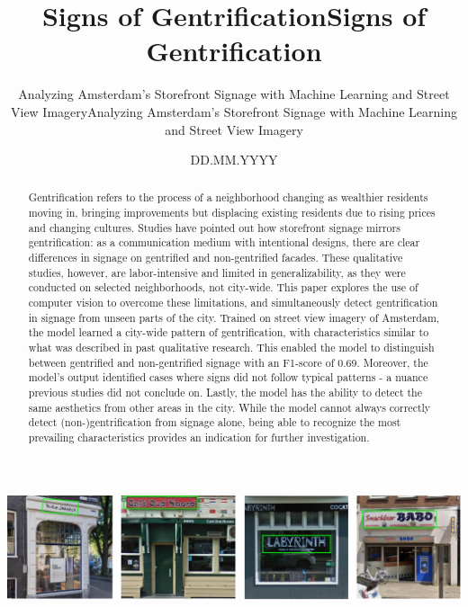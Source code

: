 \documentclass[ds, nofrontpicture, nofirstcompanypicture, nosecondcompanypicture]{mscthesis}
\title{Signs of Gentrification}
\subtitle{Analyzing Amsterdam's Storefront Signage with Machine Learning and Street View Imagery}
\date{DD.MM.YYYY}
\begin{document}
\pagestyle{plain}
\setcounter{page}{1}

\maketitlepage
\fixemptypage

\title{Signs of Gentrification}
\subtitle{Analyzing Amsterdam's Storefront Signage with Machine Learning and Street View Imagery}

\begin{abstract}
Gentrification refers to the process of a neighborhood changing as wealthier residents moving in, bringing improvements but displacing existing residents due to rising prices and changing cultures. Studies have pointed out how storefront signage mirrors gentrification: as a communication medium with intentional designs, there are clear differences in signage on gentrified and non-gentrified facades. These qualitative studies, however, are labor-intensive and limited in generalizability, as they were conducted on selected neighborhoods, not city-wide. This paper explores the use of computer vision to overcome these limitations, and simultaneously detect gentrification in signage from unseen parts of the city. Trained on street view imagery of Amsterdam, the model learned a city-wide pattern of gentrification, with characteristics similar to what was described in past qualitative research. This enabled the model to distinguish between gentrified and non-gentrified signage with an F1-score of 0.69. Moreover, the model's output identified cases where signs did not follow typical patterns - a nuance previous studies did not conclude on. Lastly, the model has the ability to detect the same aesthetics from other areas in the city. While the model cannot always correctly detect (non-)gentrification from signage alone, being able to recognize the most prevailing characteristics provides an indication for further investigation.
\end{abstract}

\begin{teaserfigure}
    \centering
    \includegraphics[width=\textwidth]{media/titlepage/frontman.jpg}
\end{teaserfigure}

\maketitle
\end{document}
